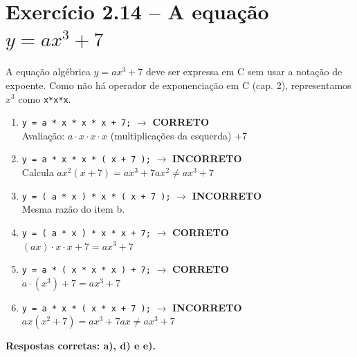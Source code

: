 \documentclass[12pt,a4paper]{article}
\begin{document}
\section{Exercício 2.14 -- A equação \texorpdfstring{$y = ax^3 + 7$}{y = ax³ + 7}}

\begin{respostabox}[title={Exercício 2.14 -- Instruções corretas para $y = ax^3 + 7$}]

A equação algébrica $y = ax^3 + 7$ deve ser expressa em C sem usar a notação de expoente.
Como não há operador de exponenciação em C (cap. 2), representamos $x^3$ como \texttt{x*x*x}.

\begin{enumerate}[label=\textbf{\alph*)}]
\item \texttt{y = a * x * x * x + 7;} $\to$ \textcolor{deitelgreen}{\textbf{CORRETO}}
  \\ Avaliação: $a \cdot x \cdot x \cdot x$ (multiplicações da esquerda) $+ 7$

\item \texttt{y = a * x * x * ( x + 7 );} $\to$ \textcolor{deitelred}{\textbf{INCORRETO}}
  \\ Calcula $ax^2(x+7) = ax^3 + 7ax^2 \neq ax^3 + 7$

\item \texttt{y = ( a * x ) * x * ( x + 7 );} $\to$ \textcolor{deitelred}{\textbf{INCORRETO}}
  \\ Mesma razão do item b.

\item \texttt{y = ( a * x ) * x * x + 7;} $\to$ \textcolor{deitelgreen}{\textbf{CORRETO}}
  \\ $(ax) \cdot x \cdot x + 7 = ax^3 + 7$ \checkmark

\item \texttt{y = a * ( x * x * x ) + 7;} $\to$ \textcolor{deitelgreen}{\textbf{CORRETO}}
  \\ $a \cdot (x^3) + 7 = ax^3 + 7$ \checkmark

\item \texttt{y = a * x * ( x * x + 7 );} $\to$ \textcolor{deitelred}{\textbf{INCORRETO}}
  \\ $ax(x^2 + 7) = ax^3 + 7ax \neq ax^3 + 7$
\end{enumerate}

\textbf{Respostas corretas: a), d) e e).}
\end{respostabox}
\end{document}
